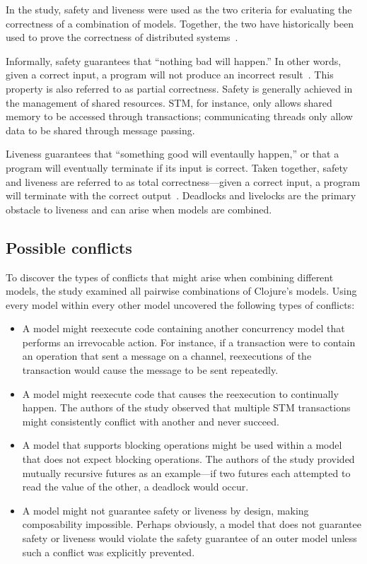 \documentclass{sig-alternate}
\begin{document}
In the study, safety and liveness were used as the two criteria for evaluating the correctness of a combination of models. Together, the two have historically been used to prove the correctness of distributed systems~\cite{Lamport1977}.

Informally, safety guarantees that ``nothing bad will happen.'' In other words, given a correct input, a program will not produce an incorrect result~\cite{Swalens2014}. This property is also referred to as partial correctness. Safety is generally achieved in the management of shared resources. STM, for instance, only allows shared memory to be accessed through transactions; communicating threads only allow data to be shared through message passing.

Liveness guarantees that ``something good will eventaully happen,'' or that a program will eventually terminate if its input is correct. Taken together, safety and liveness are referred to as total correctness---given a correct input, a program will terminate with the correct output~\cite{Swalens2014}. Deadlocks and livelocks are the primary obstacle to liveness and can arise when models are combined.

\subsection{Possible conflicts}

To discover the types of conflicts that might arise when combining different models, the study examined all pairwise combinations of Clojure's models. Using every model within every other model uncovered the following types of conflicts:

\begin{itemize}
  \item A model might reexecute code containing another concurrency model that performs an irrevocable action. For instance, if a transaction were to contain an operation that sent a message on a channel, reexecutions of the transaction would cause the message to be sent repeatedly.

  \item A model might reexecute code that causes the reexecution to continually happen. The authors of the study observed that multiple STM transactions might consistently conflict with another and never succeed.

  \item A model that supports blocking operations might be used within a model that does not expect blocking operations. The authors of the study provided mutually recursive futures as an example---if two futures each attempted to read the value of the other, a deadlock would occur.

  \item A model might not guarantee safety or liveness by design, making composability impossible. Perhaps obviously, a model that does not guarantee safety or liveness would violate the safety guarantee of an outer model unless such a conflict was explicitly prevented.
\end{itemize}
\end{document}
